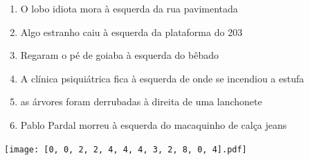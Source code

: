 \documentclass[12pt]{article}
\begin{document}
		 

\pagebreak


	\begin{enumerate}
		  \sffamily %
		  \large %


\vfill \item
O lobo idiota mora	%
à esquerda
da rua pavimentada	%

\vfill \item
Algo estranho caiu	%
à esquerda
da plataforma do 203	%

\vfill \item
Regaram o pé de goiaba	%
à esquerda
do bêbado	%

\vfill \item
A clínica psiquiátrica fica	%
à esquerda
de onde se incendiou a estufa	%

\vfill \item
as árvores foram derrubadas	%
à direita
de uma lanchonete	%

\vfill \item
Pablo Pardal morreu	%
à esquerda
do macaquinho de calça jeans	%
	\end{enumerate}
		  
		  \hfill

		  \vfill

\texttt{[image: [0, 0, 2, 2, 4, 4, 4, 3, 2, 8, 0, 4].pdf]}


	\hfill	  	  


\pagebreak			
\end{document}
